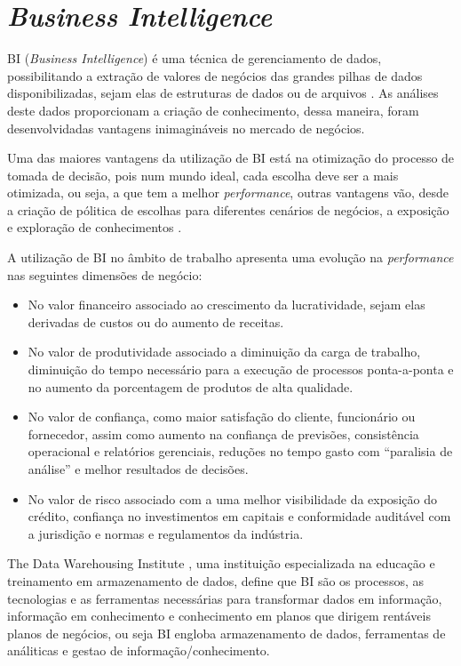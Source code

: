 \section{\textit{Business Intelligence}}
BI (\textit{Business Intelligence}) é uma técnica de gerenciamento de dados, possibilitando a extração de valores de negócios das grandes pilhas de dados disponibilizadas, sejam elas de estruturas de dados ou de arquivos \cite{business_intelligence}. As análises deste dados proporcionam a criação de conhecimento, dessa maneira, foram desenvolvidadas vantagens inimagináveis no mercado de negócios. 

Uma das maiores vantagens da utilização de BI está na otimização do processo de tomada de decisão, pois num mundo ideal, cada escolha deve ser a mais otimizada, ou seja, a que tem a melhor \textit{performance}, outras vantagens vão, desde a criação de pólitica de escolhas para diferentes cenários de negócios, a exposição e exploração de conhecimentos \cite{business_intelligence}. 

A utilização de BI no âmbito de trabalho apresenta uma evolução na \textit{performance} nas seguintes dimensões de negócio:
\begin{itemize}
		\item No valor financeiro associado ao crescimento da lucratividade, sejam elas derivadas de custos ou do aumento de receitas.
		\item No valor de produtividade associado a diminuição da carga de trabalho, diminuição do tempo necessário para a execução de processos ponta-a-ponta e no aumento da porcentagem de produtos de alta qualidade.
		\item No valor de confiança, como maior satisfação do cliente, funcionário ou fornecedor, assim como aumento na confiança de previsões, consistência operacional e relatórios gerenciais, reduções no tempo gasto com “paralisia de análise” e melhor resultados de decisões.
		\item No valor de risco associado com a uma melhor visibilidade da exposição do crédito, confiança no investimentos em capitais e conformidade auditável com a jurisdição e normas e regulamentos da indústria.
\end{itemize}
The Data Warehousing Institute \cite{tdwi}, uma instituição especializada na educação e treinamento em armazenamento de dados, define que BI são os processos, as tecnologias e as ferramentas necessárias para transformar dados em informação, informação em conhecimento e conhecimento em planos que dirigem rentáveis planos de negócios, ou seja BI engloba armazenamento de dados, ferramentas de análiticas e gestao de informação/conhecimento. 

